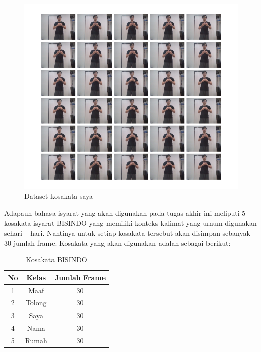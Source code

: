 \begin{figure}[H]
  \centering

  \includegraphics[scale=1.0]{gambar/bab3-dataset-citra.png}

  \caption{Dataset kosakata saya}
  \label{fig:datasetMethod}
\end{figure}

Adapaun bahasa isyarat yang akan digunakan pada tugas akhir ini meliputi 5 kosakata isyarat BISINDO yang memiliki konteks kalimat yang umum digunakan sehari – hari. Nantinya untuk setiap kosakata tersebut akan disimpan sebanyak 30 jumlah frame. Kosakata yang akan digunakan adalah sebagai berikut:

\newpage
\begin{longtable}{|c|c|c|}
  \caption{Kosakata BISINDO}
  \label{tb:kosakataBISINDO}                                   \\
  \hline
  \rowcolor[HTML]{C0C0C0}
  \textbf{No} & \textbf{Kelas} & \textbf{Jumlah Frame} \\
  \hline
  1            & Maaf                       & 30            \\
  2            & Tolong                     & 30            \\
  3            & Saya                & 30            \\
  4            & Nama                       & 30            \\
  5            & Rumah                       & 30            \\
  \hline
\end{longtable}

